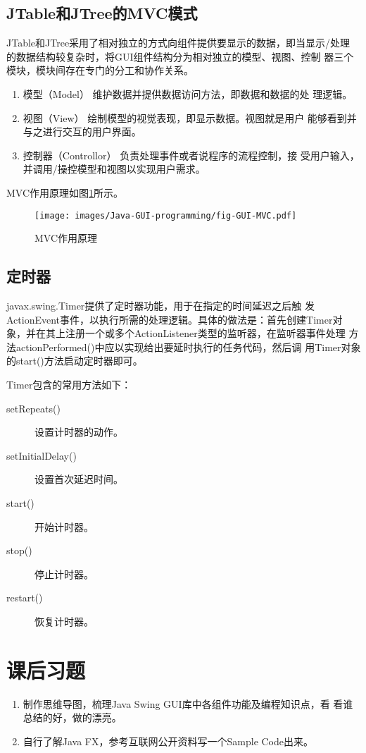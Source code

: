 \subsection{JTable和JTree的MVC模式}

JTable和JTree采用了相对独立的方式向组件提供要显示的数据，即当显示/处理
的数据结构较复杂时，将GUI组件结构分为相对独立的{\hei 模型、视图、控制
  器}三个模块，模块间存在专门的分工和协作关系。

\begin{enumerate}\kai 
\item {\hei 模型（Model）} 维护数据并提供数据访问方法，即数据和数据的处
  理逻辑。
\item {\hei 视图（View）} 绘制模型的视觉表现，即显示数据。视图就是用户
  能够看到并与之进行交互的用户界面。
\item {\hei 控制器（Controllor）} 负责处理事件或者说程序的流程控制，接
  受用户输入，并调用/操控模型和视图以实现用户需求。
\end{enumerate}

MVC作用原理如图\ref{fig:fig-GUI-MVC}所示。

\begin{figure}[htb]
\centering
\texttt{[image: images/Java-GUI-programming/fig-GUI-MVC.pdf]}
\caption{MVC作用原理}
\label{fig:fig-GUI-MVC}
\end{figure}

\subsection{定时器}

javax.swing.Timer提供了定时器功能，用于在指定的时间延迟之后触
发ActionEvent事件，以执行所需的处理逻辑。具体的做法是：首先创建Timer对
象，并在其上注册一个或多个ActionListener类型的监听器，在监听器事件处理
方法actionPerformed()中应以实现给出要延时执行的任务代码，然后调
用Timer对象的start()方法启动定时器即可。

Timer包含的常用方法如下：

\begin{description}
\item[setRepeats()] 设置计时器的动作。
\item[setInitialDelay()] 设置首次延迟时间。
\item[start()] 开始计时器。
\item[stop()] 停止计时器。
\item[restart()] 恢复计时器。
\end{description}



\section{课后习题}

\begin{enumerate}
\item 制作思维导图，梳理Java Swing GUI库中各组件功能及编程知识点，看
  看谁总结的好，做的漂亮。
\item 自行了解Java FX，参考互联网公开资料写一个Sample Code出来。
\end{enumerate}
